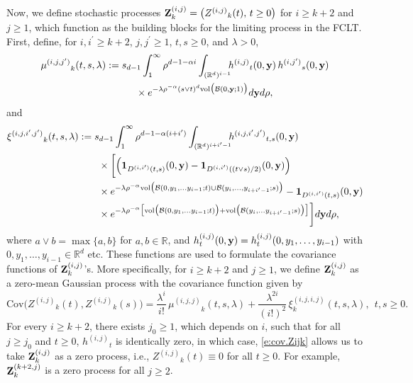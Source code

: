\documentclass[11pt]{amsart}
\numberwithin{equation}{section}
\theoremstyle{plain}
\theoremstyle{definition}
\begin{document}
Now, we define stochastic processes ${{\bf Z}}_k^{(i,j)} = \bigl({Z^{(i,j)}}_k(t), \, t\geq 0  \bigr)$ for $i \geq k+2$ and $j\geq 1$, which function as the building blocks for the limiting process in the FCLT. First, define, for $i, {i^{\prime}} \geq k+2$, $j, {j^{\prime}} \geq 1$, $t,s \geq 0$, and $\lambda > 0$,
\begin{align}
{\mu^{(i,j,{j^{\prime}})}}_k (t,s,\lambda) &:= s_{d-1} \int_1^\infty \rho^{d-1-\alpha i} \int_{({{\mathbb R}}^d)^{i-1}} \hspace{-5pt} {h^{(i,j)}}_t(0,{{\bf y}})\, {h^{(i,{j^{\prime}})}}_s(0,{{\bf y}})  \label{e:def.muijjp}  \\
& \qquad \quad \times e^{-\lambda \rho^{-\alpha} (s \vee t)^d \text{vol} \bigl( {\mathcal B} (0,{{\bf y}}; 1) \bigr)} d{{\bf y}} d\rho, \notag
\end{align}
and
\begin{align}
{\xi^{(i,j,{i^{\prime}},{j^{\prime}})}}_k(t,s,\lambda) &:= s_{d-1} \int_1^\infty \rho^{d-1-\alpha (i+{i^{\prime}})} \int_{({{\mathbb R}}^d)^{i+{i^{\prime}}-1}} \hspace{-5pt} {h^{(i, j, i^{\prime}, j^{\prime})}}_{t,s}(0,{{\bf y}}) \label{e:def.xiijipjp} \\
&  \qquad \times \biggl[ \Bigl( {{\bf 1}}_{{D^{(i,{i^{\prime}})}} (t,s)}(0,{{\bf y}}) - {{\bf 1}}_{{D^{(i,{i^{\prime}})}}( (t\vee s) /2)} (0,{{\bf y}}) \Bigr)\, \notag \\
&\qquad \times e^{-\lambda \rho^{-\alpha} \text{vol} \bigl( {\mathcal B}(0,y_1,\dots y_{i-1}; t) \cup {\mathcal B} (y_i, \dots, y_{i+{i^{\prime}}-1}; s) \bigr)}- {{\bf 1}}_{{D^{(i,{i^{\prime}})}} (t,s)}(0,{{\bf y}})   \notag \\
& \qquad  \times e^{-\lambda \rho^{-\alpha} \bigl[ \text{vol}\bigl({\mathcal B}(0,y_1,\dots y_{i-1}; t)\bigr) +  \text{vol}\bigl({\mathcal B}(y_i,\dots y_{i+{i^{\prime}}-1}; s)\bigr) \bigr]}   \biggr] d{{\bf y}} d\rho, \notag
\end{align}
where $a \vee b = \max \{ a, b \}$ for $a, b \in {{\mathbb R}}$, and $h_t^{(i,j)}(0,{{\bf y}}) = h_t^{(i,j)}(0,y_1,\dots,y_{i-1})$ with $0, y_1,\dots,y_{i-1}\in {{\mathbb R}}^d$ etc.
These functions are used to formulate the covariance functions of ${{\bf Z}}^{(i,j)}_k$'s.
More specifically, for $i \geq k+2$ and $j \geq 1$, we define ${{\bf Z}}_k^{(i,j)}$ as a zero-mean Gaussian process with the covariance function given by
\begin{equation}  \label{e:cov.Zijk}
\text{Cov} \bigl( {Z^{(i,j)}}_k(t), {Z^{(i,j)}}_k(s) \bigr)
= \frac{\lambda^i}{i!}\, {\mu^{(i,j,j)}}_k(t,s,\lambda) + \frac{\lambda^{2i}}{(i!)^2}\, \xi^{(i,j,i,j)}_k(t,s,\lambda), \ \ t,s \geq 0.
\end{equation}
For every $i \geq k+2$, there exists $j_0  \geq 1$, which depends on $i$, such that for all $j \geq j_0$ and $t\geq0$, ${h^{(i,j)}}_t$ is identically zero, in which case, \eqref{e:cov.Zijk} allows us to take ${{\bf Z}}_k^{(i,j)}$ as a zero process, i.e., ${Z^{(i,j)}}_k(t) \equiv 0$ for all $t\geq0$. For example, ${{\bf Z}}_k^{(k+2,j)}$ is a zero process for all $j \geq 2$.
\end{document}

